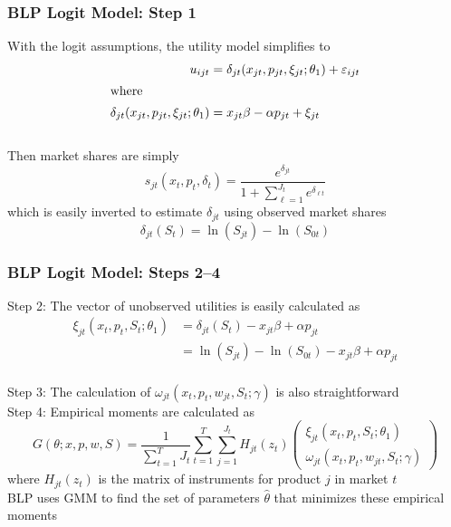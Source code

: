 \documentclass{beamer}
\begin{document}
\begin{frame}\frametitle{BLP Logit Model: Step 1}
    With the logit assumptions, the utility model simplifies to 
    \begin{align*}
        u_{ijt} &= \delta_{jt}(x_{jt}, p_{jt}, \xi_{jt}; \theta_1) + \varepsilon_{ijt} \\
        \intertext{where}
        \delta_{jt}(x_{jt}, p_{jt}, \xi_{jt}; \theta_1) &= x_{jt} \beta - \alpha p_{jt} + \xi_{jt}
    \end{align*} \\
    \vspace{2ex}
    Then market shares are simply
    $$s_{jt}(x_t, p_t, \delta_t) = \frac{e^{\delta_{jt}}}{1 + \sum_{\ell = 1}^{J_t} e^{\delta_{\ell t}}}$$
    which is easily inverted to estimate $\delta_{jt}$ using observed market shares
    $$\delta_{jt}(S_t) = \ln(S_{jt}) - \ln(S_{0t})$$
\end{frame}

\begin{frame}\frametitle{BLP Logit Model: Steps 2--4}
    Step 2: The vector of unobserved utilities is easily calculated as
    \begin{align*}
        \xi_{jt}(x_t, p_t, S_t; \theta_1) &= \delta_{jt}(S_t) - x_{jt} \beta + \alpha p_{jt} \\
        &=  \ln(S_{jt}) - \ln(S_{0t}) - x_{jt} \beta + \alpha p_{jt}
    \end{align*} \\
    \vspace{1ex}
    Step 3: The calculation of $\omega_{jt}(x_t, p_t, w_{jt}, S_t; \gamma)$ is also straightforward \\
    \vspace{2ex}
    Step 4: Empirical moments are calculated as
    $$G(\theta; x, p, w, S) = \frac{1}{\sum_{t = 1}^T J_t} \sum_{t = 1}^T \sum_{j = 1}^{J_t} H_{jt}(z_t) 
    \begin{pmatrix}
        \xi_{jt}(x_t, p_t, S_t; \theta_1) \\
        \omega_{jt}(x_t, p_t, w_{jt}, S_t; \gamma)
    \end{pmatrix}$$
    where $H_{jt}(z_t)$ is the matrix of instruments for product $j$ in market $t$ \\
    \vspace{2ex}
    BLP uses GMM to find the set of parameters $\hat{\theta}$ that minimizes these empirical moments
\end{frame}
\end{document}
